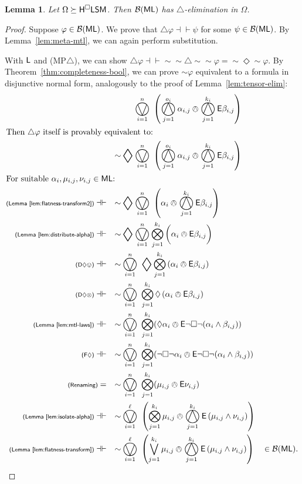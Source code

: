 \documentclass[a4paper,english,fleqn,11pt,final]{scrartcl}
\newcommand{\logicOpFont}[1]{\mathsf{#1}}
\newcommand{\negg}{{\sim}}
\newcommand{\logic}[1]{\ensuremath{\mathsf{#1}}\xspace}
\newcommand{\ML}{\logic{ML}}
\newcommand{\E}{\protect\ensuremath\logicOpFont{E}}
\newcommand{\calB}{\protect\ensuremath{\mathcal{B}}}
\newcommand{\sfS}{\protect\ensuremath{\mathsf{S}}}
\newcommand{\sfH}{\protect\ensuremath{\mathsf{H}}}
\newcommand{\sfL}{\protect\ensuremath{\mathsf{L}}}
\newcommand{\sfM}{\protect\ensuremath{\mathsf{M}}}
\newcommand{\eqpr}{\dashv\vdash}
\newcommand{\tens}{\otimes}
\newcommand{\Deriv}[1]{{\normalfont\textsf{#1}}}
\newcommand{\Apply}[1]{\textsf{\scriptsize{}#1}}
\newcommand{\oland}{\owedge}
\DeclareMathOperator*{\bigovee}{\scalerel*{\ovee}{\sum}}
\DeclareMathOperator*{\bigoland}{\scalerel*{\owedge}{\sum}}
\DeclareMathOperator*{\bigtens}{\bigotimes}
\DeclareMathOperator*{\bigdiamond}{\scalerel*{\Diamond}{\sum}}
\theoremstyle{plain}
\newtheorem{lemma}[theorem]{Lemma}
\theoremstyle{definition}
\begin{document}
\begin{lemma}\label{lem:step-diamond-mtl}
Let $\Omega \succeq \sfH^\Box\sfL\sfS\sfM$. Then $\calB(\ML)$ has $\triangle$-elimination in $\Omega$.
\end{lemma}
\begin{proof}
Suppose $\varphi \in \calB(\ML)$.
We prove that $\triangle\varphi \eqpr \psi$ for some $\psi \in \calB(\ML)$.
By Lemma~\ref{lem:meta-mtl}, we can again perform substitution.

With $\sfL$ and \Deriv{(MP$\triangle$)}, we can show $\triangle\varphi\eqpr \negg\negg\triangle\negg\negg\varphi = \negg\Diamond\negg\varphi$.
By Theorem~\ref{thm:completeness-bool}, we can prove $\negg\varphi$ equivalent to a formula in disjunctive normal form, analogously to the proof of Lemma~\ref{lem:tensor-elim}:
\begin{align*}
	\quad&\phantom{\negg\bigdiamond} \bigovee_{i = 1}^{n}\;  \left(\bigoland_{j=1}^{o_i}\alpha_{i,j} \oland \bigoland_{j = 1}^{k_i}\E \beta_{i,j} \right)\\
	\intertext{Then $\triangle\varphi$ itself is provably equivalent to:}
	\quad&\negg\bigdiamond  \bigovee_{i = 1}^{n}\;  \left(\bigoland_{j=1}^{o_i}\alpha_{i,j} \oland \bigoland_{j = 1}^{k_i}\E \beta_{i,j} \right)\\
\intertext{For suitable $\alpha_i,\mu_{i,j},\nu_{i,j}\in \ML$:}
	\Apply{(Lemma~\ref{lem:flatness-transform2})}\eqpr \quad&\negg\bigdiamond  \bigovee_{i = 1}^{n}\;  \left(\alpha_{i} \oland \bigoland_{j = 1}^{k_i}\E \beta_{i,j} \right)\\
	\Apply{(Lemma~\ref{lem:distribute-alpha})}\eqpr \quad &\negg\bigdiamond \bigovee_{i = 1}^{n} \bigtens_{j=1}^{k_i} \bigg( \alpha_{i} \oland \E \beta_{i,j} \bigg)\\
	\Apply{(D$\Diamond\ovee$)}\eqpr \quad&\negg \bigovee_{i = 1}^{n}\; \bigdiamond \bigtens_{j=1}^{k_i} \left(\alpha_{i} \oland \E \beta_{i,j} \right)\\
	\Apply{(D$\Diamond\tens$)}\eqpr \quad&\negg \bigovee_{i = 1}^{n}\; \bigtens_{j=1}^{k_i} \Diamond \left(\alpha_{i} \oland \E \beta_{i,j} \right)\\
	\Apply{(Lemma~\ref{lem:mtl-laws})} \eqpr \quad &\negg\bigovee_{i = 1}^{n}\;  \bigtens_{j=1}^{k_i} (\Diamond\alpha_i \oland \E\neg\Box\neg(\alpha_i\land\beta_{i,j}))\\
	\Apply{(F$\Diamond$)} \eqpr \quad &\negg\bigovee_{i = 1}^{n}\;  \bigtens_{j=1}^{k_i} (\neg\Box\neg\alpha_i \oland \E\neg\Box\neg(\alpha_i\land\beta_{i,j}))\\
	\Apply{(Renaming)} = \quad &\negg\bigovee_{i = 1}^{n}\;  \bigtens_{j=1}^{k_i}(\mu_{i,j} \oland \E\nu_{i,j}) \\\Apply{(Lemma~\ref{lem:isolate-alpha})}\eqpr \quad &\negg\bigovee_{i = 1}^{\ell} \; \left(\bigtens_{j=1}^{k_i} \mu_{i,j} \oland \bigoland_{j=1}^{k_i} \E \left(\mu_{i,j} \land \nu_{i,j} \right)\right)\\
	\Apply{(Lemma~\ref{lem:flatness-transform})}\eqpr \quad &\negg\bigovee_{i = 1}^{\ell} \; \left(\bigvee_{j=1}^{k_i} \mu_{i,j} \oland \bigoland_{j=1}^{k_i} \E \left(\mu_{i,j} \land \nu_{i,j} \right)\right) \quad \in \calB(\ML)\text{.}\qedhere
\end{align*}
\end{proof}
\end{document}
